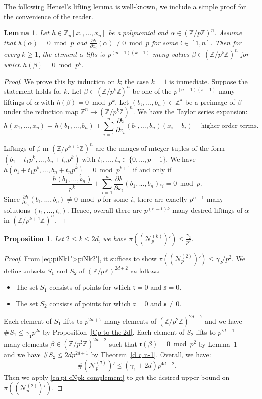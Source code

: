 \documentclass[12pt]{amsart}
\newtheorem{lemma}[theorem]{Lemma}
\newtheorem{proposition}[theorem]{Proposition}
\newcommand{\cN}{\mathcal{N}}
\newcommand{\Z}{\mathbb{Z}}
\numberwithin{equation}{section}
\begin{document}
The following  Hensel's lifting lemma is well-known, we include a simple proof for the convenience of the reader.
\begin{lemma}\label{partial derivative lemma}
    Let $h\in \Z_p[x_1, \dots, x_n]$ be a polynomial and $\alpha\in (\Z/p\Z)^n$. Assume that $h(\alpha)=0\bmod p$ and $\frac{\partial h}{\partial x_i}(\alpha)\neq 0\bmod p$ for some $i\in [1,n]$. Then for every $k\geq 1$, the element $\alpha$ lifts to $p^{(n-1)(k-1)}$ many values $\beta\in (\Z/p^k\Z)^n$ for which $h(\beta)=0\bmod p^k$.
\end{lemma}
\begin{proof}
We prove this by induction on $k$; the case $k=1$ is immediate. Suppose the statement holds for $k$. Let $\beta\in(\Z/p^k\Z)^n$ be one of the $p^{(n-1)(k-1)}$ many liftings of $\alpha$
with $h(\beta)=0\bmod p^k$. Let $(b_1,\ldots,b_n)\in\Z^n$ be a preimage of $\beta$ under the reduction map $\Z^n\rightarrow (\Z/p^k\Z)^n$. We have the Taylor series expansion:
\[h(x_1, \dots, x_n)=h(b_1,\ldots,b_n)+\sum_{i=1}^n \frac{\partial h }{\partial x_i}(b_1,\ldots,b_n)(x_i-b_i)+\text{higher order terms}.\]

Liftings of $\beta$ in $(\Z/p^{k+1}\Z)^n$ are the images of integer tuples 
of the form
$(b_1+t_1p^k,\ldots,b_n+t_np^k)$ with $t_1,\ldots,t_n\in\{0,\ldots,p-1\}$. We have
$h(b_1+t_1p^k,\ldots,b_n+t_np^k)=0\bmod p^{k+1}$ if and only if
$$\frac{h(b_1,\ldots,b_n)}{p^k}+\sum_{i=1}^n \frac{\partial h }{\partial x_i}(b_1,\ldots,b_n)t_i=0\bmod p.$$
Since $\frac{\partial h}{\partial x_i}(b_1,\ldots,b_n)\neq 0\bmod p$ for some $i$, there are 
exactly $p^{n-1}$ many solutions $(t_1,\ldots,t_n)$. Hence, overall there are 
$p^{(n-1)k}$ many desired liftings of $\alpha$ in $(\Z/p^{k+1}\Z)^n$.
\end{proof}


\begin{proposition}\label{prop:gamma2}
     Let $2\leq k\leq 2d$, we have $\displaystyle\pi((\cN_p^{(k)})')\leq \frac{\gamma_2}{p^2}$.
\end{proposition}
\begin{proof}
From \eqref{eq:piNk1'>piNk2'}, it suffices to show $\pi((\cN_p^{(2)})')\leq \gamma_2/p^2$.  We define subsets $S_1$ and $S_2$ of $(\Z/p\Z)^{2d+2}$ as follows. 
\begin{itemize}
    \item The set $S_1$ consists of points for which $\mathfrak{r}=0$ and $\mathfrak{s}=0$. 
    \item The set $S_2$ consists of points for which $\mathfrak{r}=0$ and $\mathfrak{s}\neq 0$. 
\end{itemize}
Each element of $S_1$ lifts to $p^{2d+2}$ many elements of $(\Z/p^2\Z)^{2d+2}$ and we have
$\#S_1\leq \gamma_1p^{2d}$ by Proposition~\ref{Cp to the 2d}. Each element of
$S_2$ lifts to $p^{2d+1}$ many elements $\beta\in(\Z/p^2\Z)^{2d+2}$ such that
$\mathfrak{r}(\beta)=0\bmod p^2$ by Lemma~\ref{partial derivative lemma} and we have $\#S_2\leq 2dp^{2d+1}$ by Theorem~\ref{d q n-1}. Overall, we have:
$$\# (\cN_p^{(2)})'\leq (\gamma_1+2d)p^{4d+2}.$$
Then we apply \eqref{eq:pi cNpk complement} to get the desired upper bound on $\pi((\cN_p^{(2)})')$.
\end{proof}
\end{document}
